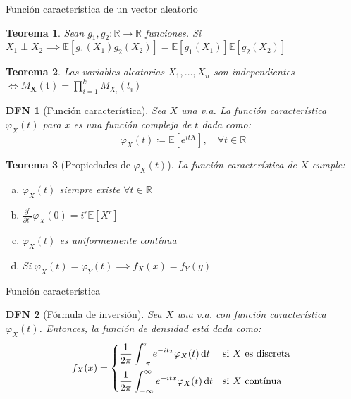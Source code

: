 \documentclass[a4paper]{article}
\newtheorem{definition}{DFN}
\theoremstyle{mytheoremstyle}
\newtheorem{theorem}{Teorema}
\newcommand{\R}{\mathbb{R}}
\newcommand{\E}{\mathbb{E}}
\newcommand{\1}{\mathds{1}}
\renewcommand{\vec}[1]{\boldsymbol{#1}}
\newcommand{\diff}[1]{\,\mathrm{d}#1}
\begin{document}
\begin{multicols*}{3}
\begin{roundbox}{Función característica de un vector aleatorio}
\begin{theorem}
    Sean $g_1, g_2: \R \to \R$ funciones. Si $X_1 \perp X_2 \implies \E\left[ g_1(X_1) g_2(X_2) \right] = \E \left[ g_1(X_1) \right] \E \left[ g_2(X_2) \right]$
\end{theorem}

\begin{theorem}
    Las variables aleatorias $X_1, \dots , X_n$ son independientes$\iff M_{\vec{X}}(\vec{t}) = \prod_{i=1}^{k} M_{X_i} (t_i)$ 
\end{theorem}

\begin{definition}[Función característica]
    Sea $X$ una v.a.
    La función característica $\varphi_{X} (t)$ para $x$ es una función compleja de $t$  dada como:
    \begin{equation*}
        \varphi_{X}(t) \coloneqq \E \left[ e^{itX} \right], \quad \forall t \in \R
    \end{equation*}
\end{definition}

\begin{theorem}[Propiedades de $\varphi_{X}(t)$]
    La función característica de $X$ cumple:
    \begin{enumerate}[a)]
        \item $\varphi_{X}(t)$ siempre existe $\forall t \in \R$ 
        \item $\frac{\partial^{r}}{\partial t^{r}} \varphi_{X}(0) = i^{r} \E\left[ X^{r} \right]$
        \item $\varphi_{X}(t)$ es uniformemente contínua
        \item Si $\varphi_{X}(t) = \varphi_{Y}(t) \implies f_{X}(x) = f_{Y}(y)$
    \end{enumerate}
\end{theorem}
\end{roundbox}

\begin{roundbox}{Función característica}
\begin{definition}[Fórmula de inversión]
    Sea $X$ una v.a. con función característica $\varphi_{X}(t)$. Entonces, la función de densidad está dada como:
    \begin{equation*}
        f_{X}(x) = \begin{dcases*}
            \frac{1}{2\pi} \int_{-\pi}^{\pi} e^{-itx} \varphi_{X}(t) \diff{t} & si $X$ es discreta \\
            \frac{1}{2\pi} \int_{-\infty}^{\infty} e^{-itx} \varphi_{X}(t) \diff{t} & si $X$ contínua
        \end{dcases*}
    \end{equation*}
\end{definition}


\end{roundbox}
\end{multicols*}
\end{document}
